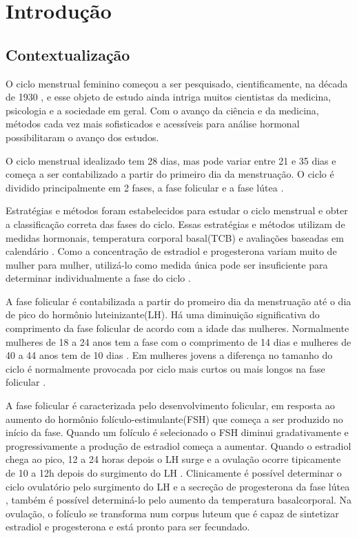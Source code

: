 \chapter[Introdução]{Introdução}

\section{Contextualização}

O ciclo menstrual feminino começou a ser pesquisado, cientificamente, na década de 1930 \cite{frank1931}, e esse objeto de estudo ainda intriga muitos cientistas da medicina, psicologia e a sociedade em geral. Com o avanço da ciência e da medicina, métodos cada vez mais sofisticados e acessíveis para análise hormonal possibilitaram o avanço dos estudos.

O ciclo menstrual idealizado tem 28 dias, mas pode variar entre 21 e 35 dias \cite{lenton1984a} e começa a ser contabilizado a partir do primeiro dia da menstruação. O ciclo é dividido principalmente em 2 fases, a fase folicular e a fase lútea \cite{brondin2008}.

Estratégias e métodos foram estabelecidos para estudar o ciclo menstrual e obter a classificação correta das fases do ciclo. Essas estratégias e métodos utilizam de medidas hormonais, temperatura corporal basal(TCB) e avaliações baseadas em calendário \cite{becker2005}. Como a concentração de estradiol e progesterona variam muito de mulher para mulher, utilizá-lo como medida única pode ser insuficiente para determinar individualmente a fase do ciclo \cite{poroma2014}.

A fase folicular é contabilizada a partir do promeiro dia da menstruação até o dia de pico do hormônio luteinizante(LH). Há uma diminuição significativa do comprimento da fase folicular de acordo com a idade das mulheres. Normalmente mulheres de 18 a 24 anos tem a fase com o comprimento de 14 dias e mulheres de 40 a 44 anos tem de 10 dias \cite{lenton1984a}. Em mulheres jovens a diferença no tamanho do ciclo é normalmente provocada por ciclo mais curtos ou mais longos na fase folicular \cite{lenton1984a}.

A fase folicular é caracterizada pelo desenvolvimento folicular, em resposta ao aumento do hormônio folículo-estimulante(FSH) que começa a ser produzido no início da fase. Quando um folículo é selecionado o FSH diminui gradativamente e progressivamente a produção de estradiol começa a aumentar. Quando o estradiol chega ao pico, 12 a 24 horas depois o LH surge e a ovulação ocorre tipicamente de 10 a 12h depois do surgimento do LH \cite{fritz2010}. Clinicamente é possível determinar o ciclo ovulatório pelo surgimento do LH e a secreção de progesterona da fase lútea \cite{fritz2010}, também é possível determiná-lo pelo aumento da temperatura basalcorporal. Na ovulação, o folículo se transforma num corpus luteum que é capaz de sintetizar estradiol e progesterona e está pronto para ser fecundado.

